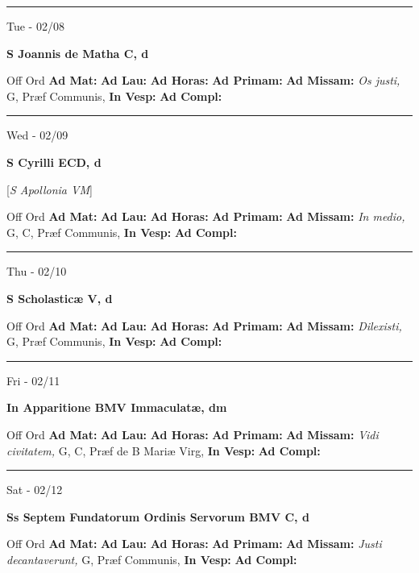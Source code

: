 \documentclass[letterpaper, 10pt]{article}
\begin{document}
\hrule
\begin{center}
Tue - 02/08
\end{center}\textbf{ \large S Joannis de Matha C, \textnormal{\normalsize d}}
\begin{justify}
Off Ord
\textbf{Ad Mat: }
\textbf{Ad Lau: }
\textbf{Ad Horas: }
\textbf{Ad Primam: }
\textbf{Ad Missam:} \textit{Os justi, } G, Præf Communis, 
\textbf{In Vesp: }
\textbf{Ad Compl: }\end{justify}



\hrule
\begin{center}
Wed - 02/09
\end{center}\textbf{ \large S Cyrilli ECD, \textnormal{\normalsize d}}

[\textit{S Apollonia VM}]
\begin{justify}
Off Ord
\textbf{Ad Mat: }
\textbf{Ad Lau: }
\textbf{Ad Horas: }
\textbf{Ad Primam: }
\textbf{Ad Missam:} \textit{In medio, } G, C, Præf Communis, 
\textbf{In Vesp: }
\textbf{Ad Compl: }\end{justify}



\hrule
\begin{center}
Thu - 02/10
\end{center}\textbf{ \large S Scholasticæ V, \textnormal{\normalsize d}}
\begin{justify}
Off Ord
\textbf{Ad Mat: }
\textbf{Ad Lau: }
\textbf{Ad Horas: }
\textbf{Ad Primam: }
\textbf{Ad Missam:} \textit{Dilexisti, } G, Præf Communis, 
\textbf{In Vesp: }
\textbf{Ad Compl: }\end{justify}



\hrule
\begin{center}
Fri - 02/11
\end{center}\textbf{ \large In Apparitione BMV Immaculatæ, \textnormal{\normalsize dm}}
\begin{justify}
Off Ord
\textbf{Ad Mat: }
\textbf{Ad Lau: }
\textbf{Ad Horas: }
\textbf{Ad Primam: }
\textbf{Ad Missam:} \textit{Vidi civitatem, } G, C, Præf de B Mariæ Virg, 
\textbf{In Vesp: }
\textbf{Ad Compl: }\end{justify}



\hrule
\begin{center}
Sat - 02/12
\end{center}\textbf{ \large Ss Septem Fundatorum Ordinis Servorum BMV C, \textnormal{\normalsize d}}
\begin{justify}
Off Ord
\textbf{Ad Mat: }
\textbf{Ad Lau: }
\textbf{Ad Horas: }
\textbf{Ad Primam: }
\textbf{Ad Missam:} \textit{Justi decantaverunt, } G, Præf Communis, 
\textbf{In Vesp: }
\textbf{Ad Compl: }\end{justify}
\end{document}
